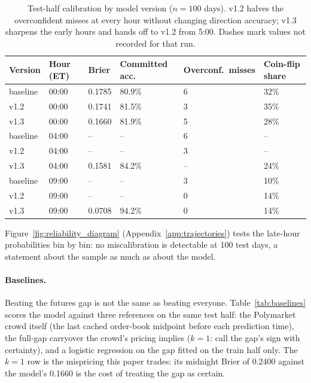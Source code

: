 \begin{table}[h]
    \centering
    \small
    \caption{Test-half calibration by model version ($n=100$ days). v1.2
    halves the overconfident misses at every hour without changing direction
    accuracy; v1.3 sharpens the early hours and hands off to v1.2 from 5:00.
    Dashes mark values not recorded for that run.}
    \label{tab:calibration}
    \begin{tabular}{llllll}
        \toprule
        Version & Hour (ET) & Brier & Committed acc. & Overconf.\ misses & Coin-flip share \\
        \midrule
        baseline & 00:00 & 0.1785 & 80.9\% & 6 & 32\% \\
        v1.2     & 00:00 & 0.1741 & 81.5\% & 3 & 35\% \\
        v1.3     & 00:00 & 0.1660 & 81.9\% & 5 & 28\% \\
        \midrule
        baseline & 04:00 & --     & --     & 6 & -- \\
        v1.2     & 04:00 & --     & --     & 3 & -- \\
        v1.3     & 04:00 & 0.1581 & 84.2\% & -- & 24\% \\
        \midrule
        baseline & 09:00 & --     & --     & 3 & 10\% \\
        v1.2     & 09:00 & --     & --     & 0 & 14\% \\
        v1.3     & 09:00 & 0.0708 & 94.2\% & 0 & 14\% \\
        \bottomrule
    \end{tabular}
\end{table}

Figure~\ref{fig:reliability_diagram} (Appendix~\ref{app:trajectories})
tests the late-hour probabilities bin by bin: no miscalibration is
detectable at 100 test days, a statement about the sample as much as about
the model.

\paragraph{Baselines.}
Beating the futures gap is not the same as beating everyone.
Table~\ref{tab:baselines} scores the model against three references on the
same test half: the Polymarket crowd itself (the last cached order-book
midpoint before each prediction time), the full-gap carryover the crowd's
pricing implies ($k=1$: call the gap's sign with certainty), and a logistic
regression on the gap fitted on the train half only. The $k=1$ row is the
mispricing this paper trades: its midnight Brier of 0.2400 against the
model's 0.1660 is the cost of treating the gap as certain.

